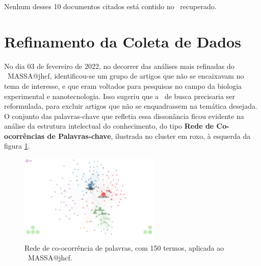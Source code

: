 Nenhum desses 10 documentos citados está contido no \dataset\   recuperado.



\section{Refinamento da Coleta de Dados}

No dia 03 de fevereiro de 2022, no decorrer das análises mais refinadas do \dataset\ MASSA@jhcf, identificou-se um grupo de artigos que não se encaixavam no tema de interesse, e que eram voltados para pesquisas no campo da biologia experimental e nanotecnologia. Isso sugeriu que a \query\  de busca precisaria ser reformulada, para excluir artigos que não se enquadrassem na temática desejada.
O conjunto das palavras-chave que refletia essa dissonância ficou evidente na análise da estrutura intelectual do conhecimento, do tipo \textbf{Rede de Co-ocorrências de Palavras-chave}, ilustrada no cluster em roxo, à esquerda da figura \ref{fig:MASSA@jhcf:redecoocorr-150-termos}.

\begin{figure}[htp]
    \centering
    \includegraphics[clip=true,trim={9cm 0cm 7cm 0cm },width=0.6\textwidth]{experiments/jhcf/PesqBibliogr/SimulacaoMultiagente/WoS-20210803/classico-mais-citacoes/Structure-Informetric/Conceptual/Co-occurrence Network-Keywords-Plus-150-termos.png}
    \caption{Rede de co-ocorrência de palavras, com 150 termos, aplicada ao \dataset\   MASSA@jhcf.}
    \label{fig:MASSA@jhcf:redecoocorr-150-termos}
\end{figure}

